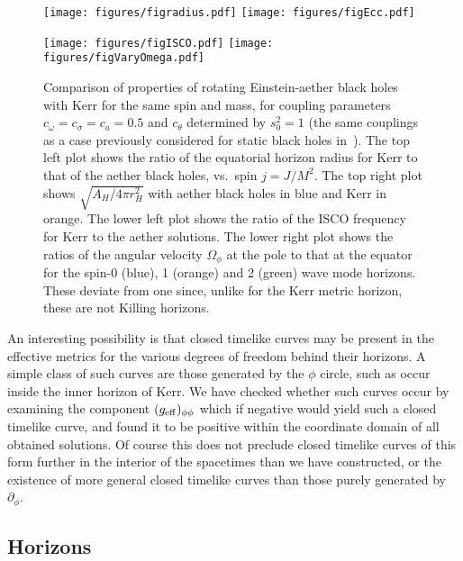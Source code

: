 \documentclass[12pt]{article}
\numberwithin{equation}{section}
\begin{document}
\begin{figure}
\centerline{  \texttt{[image: figures/figradius.pdf]}
   \texttt{[image: figures/figEcc.pdf]}}
\centerline{    \texttt{[image: figures/figISCO.pdf]}
 \texttt{[image: figures/figVaryOmega.pdf]} }
  \caption{\label{fig:comparison}
Comparison of properties of rotating Einstein-aether black holes with Kerr for the same spin and mass, for coupling parameters
  $c_\omega=c_\sigma=c_a=0.5$ and $c_\theta$ determined by $s_0^2=1$ (the same couplings 
  as a case previously considered 
  for static black holes 
   in~\cite{Barausse:2011pu}).
  The top left plot shows the ratio of the equatorial horizon radius for Kerr to that of the aether black holes, vs.\ spin $j= J/M^2$. The top right plot shows $\sqrt{A_H/4\pi r_H^2}$ with aether black holes in blue and Kerr in orange. 
  The lower left plot shows the ratio of the ISCO frequency for Kerr to the aether solutions. The lower right plot shows the ratios of the angular velocity $\Omega_\phi$ at the pole to that at the equator for the spin-0 (blue), 1 (orange) and 2 (green) wave mode horizons. These deviate from one since, unlike for the Kerr metric horizon, these are not Killing horizons. 
 }
\end{figure}

An interesting possibility is that closed timelike curves may be present in the effective metrics for the various degrees of freedom behind their horizons. A simple class of such curves are those generated by the $\phi$ circle, such as occur inside the inner horizon of Kerr. We have checked whether such curves occur by examining the component $(g_{\rm eff})_{\phi\phi}$ which if negative would yield such a closed timelike curve, and found it to be positive
within the coordinate domain of all obtained solutions. Of course this does not preclude closed timelike curves of this form further in the interior of the spacetimes than we have constructed, or the existence of more general closed timelike curves than those purely generated by $\partial_\phi$.


\subsection{Horizons}
\label{sec:nonKillinghorizons}
\end{document}
